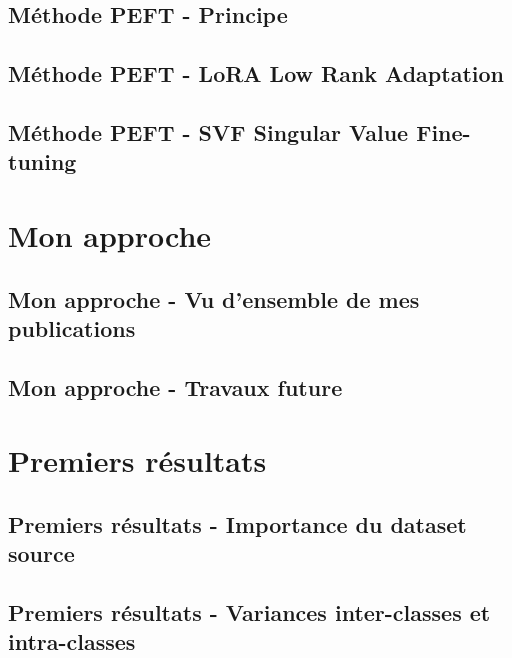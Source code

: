 \documentclass[xcolor=table, 8pt]{beamer}
\begin{document}
    \subsection{Méthode PEFT - Principe}\label{subsec:peft-principle}

    \subsection{Méthode PEFT - LoRA Low Rank Adaptation}\label{subsec:peft-lora}
    

    \subsection{Méthode PEFT - SVF Singular Value Fine-tuning}\label{subsec:peft-svf}
    


    \section{Mon approche}\label{sec:approach}

    \subsection{Mon approche - Vu d'ensemble de mes publications}\label{subsec:approach-publications}
    

    \subsection{Mon approche - Travaux future}\label{subsec:approach-future-work}
    

    \section{Premiers résultats}\label{sec:results}

    \subsection{Premiers résultats - Importance du dataset source}\label{subsec:results-srcdata}
    


    \subsection{Premiers résultats - Variances inter-classes et intra-classes}\label{subsec:results-variances}
    
    
\end{document}
